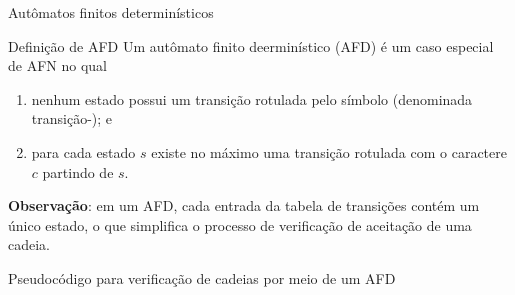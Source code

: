 \begin{frame}[fragile]{Autômatos finitos determinísticos}

    \begin{block}{Definição de AFD}
        Um autômato finito deerminístico (AFD) é um caso especial de AFN no qual
        \begin{enumerate}
            \item nenhum estado possui um transição rotulada pelo símbolo  (denominada transição-); e
            \item para cada estado $s$ existe no máximo uma transição rotulada com o caractere $c$ partindo de $s$.
        \end{enumerate}
    \end{block}

    \vspace{0.2in}

    \textbf{Observação}: em um AFD, cada entrada da tabela de transições contém um único estado, o que simplifica o processo de verificação de aceitação de uma cadeia.
\end{frame}

\begin{frame}[fragile]{Pseudocódigo para verificação de cadeias por meio de um AFD}

    \begin{algorithmic}[1]
        \vspace{0.2in}
        \Statex
        \EndWhile
        \Statex
            \State {}
        \Else
            \State {}
        \EndIf
    \end{algorithmic}

\end{frame}

